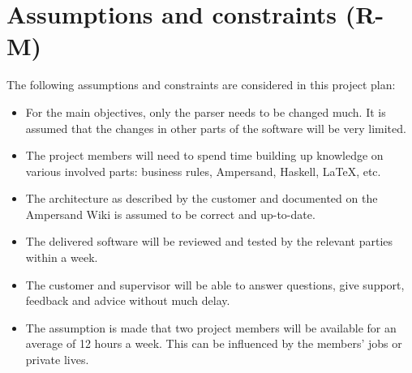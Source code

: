\section{Assumptions and constraints (R-M)}
\label{sec:assumptions-constraints}
The following assumptions and constraints are considered in this project plan:
\begin{itemize}
	\item For the main objectives, only the parser needs to be changed much.
		It is assumed that the changes in other parts of the software will be very limited.
	\item The project members will need to spend time building up knowledge on various involved parts:
		business rules, Ampersand, Haskell, LaTeX, etc.
	\item The architecture as described by the customer and documented on the Ampersand Wiki is assumed to be correct and up-to-date.
	\item The delivered software will be reviewed and tested by the relevant parties within a week.
	\item The customer and supervisor will be able to answer questions, give support, feedback and advice without much delay.
	\item The assumption is made that two project members will be available for an average of 12 hours a week.
		This can be influenced by the members' jobs or private lives.
\end{itemize}